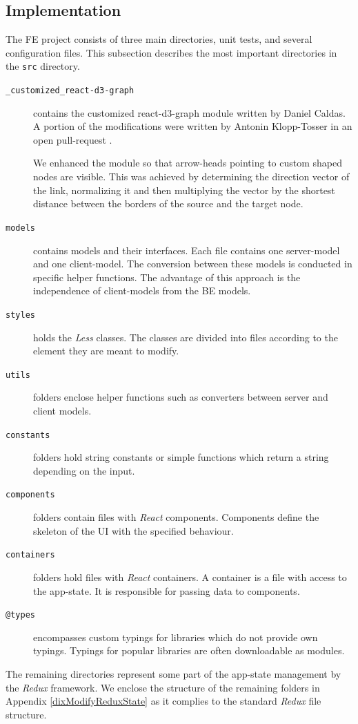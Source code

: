 \subsection{Implementation} \label{FEImplementation}
The FE project consists of three main directories, unit tests, and several configuration files. This subsection describes the most important directories in the \texttt{src} directory. 
\begin{description}
    \item[\texttt{\_customized\_react-d3-graph}] contains the customized react-d3-graph module \cite{reactD3Graph} written by Daniel Caldas. A portion of the modifications were written by Antonin Klopp-Tosser in an open pull-request \cite{reactD3GraphPR}. 

We enhanced the module so that arrow-heads pointing to custom shaped nodes are visible. This was achieved by determining the direction vector of the link, normalizing it and then multiplying the vector by the shortest distance between the borders of the source and the target node.
    \item[\texttt{models}] contains models and their interfaces. Each file contains one server-model and one client-model. The conversion between these models is conducted in specific helper functions. The advantage of this approach is the independence of client-models from the BE models.
    \item[\texttt{styles}] holds the \textit{Less} classes. The classes are divided into files according to the element they are meant to modify.
    \item[\texttt{utils}] folders enclose helper functions such as converters between server and client models.
    \item[\texttt{constants}] folders hold string constants or simple functions which return a string depending on the input. 
    \item[\texttt{components}] folders contain files with \textit{React} components. Components define the skeleton of the UI with the specified behaviour.
    \item[\texttt{containers}] folders hold files with \textit{React} containers. A container is a file with access to the app-state. It is responsible for passing data to components. 
    \item[\texttt{@types}] encompasses custom typings for libraries which do not provide own typings. Typings for popular libraries are often downloadable as modules.
\end{description}
The remaining directories represent some part of the app-state management by the \textit{Redux} framework. We enclose the structure of the remaining folders in Appendix \ref{dixModifyReduxState} as it complies to the standard \textit{Redux} file structure.
